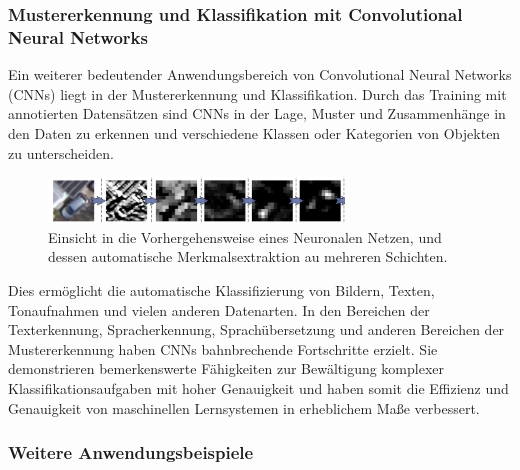         \subsubsection{Mustererkennung und Klassifikation mit Convolutional Neural Networks}
    
            Ein weiterer bedeutender Anwendungsbereich von Convolutional Neural Networks (\acfp{CNN}) liegt in der Mustererkennung und Klassifikation. 
            Durch das Training mit annotierten Datensätzen sind \acp{CNN} in der Lage, Muster und Zusammenhänge in den Daten zu erkennen und verschiedene Klassen oder Kategorien von Objekten zu unterscheiden.

            \begin{figure}[h]
                \centering
                \includegraphics[width=0.7\textwidth]{img/feature_extraction.png}
                \caption{Einsicht in die Vorhergehensweise eines Neuronalen Netzen, und dessen automatische Merkmalsextraktion au mehreren Schichten.}
                \label{fig:feature_extraction}
            \end{figure}
            
            Dies ermöglicht die automatische Klassifizierung von Bildern, Texten, Tonaufnahmen und vielen anderen Datenarten. 
            In den Bereichen der Texterkennung, Spracherkennung, Sprachübersetzung und anderen Bereichen der Mustererkennung haben \acp{CNN} bahnbrechende Fortschritte erzielt. 
            Sie demonstrieren bemerkenswerte Fähigkeiten zur Bewältigung komplexer Klassifikationsaufgaben mit hoher Genauigkeit und haben somit die Effizienz und Genauigkeit von maschinellen Lernsystemen in erheblichem Maße verbessert.
            
        \subsubsection{Weitere Anwendungsbeispiele}
    
